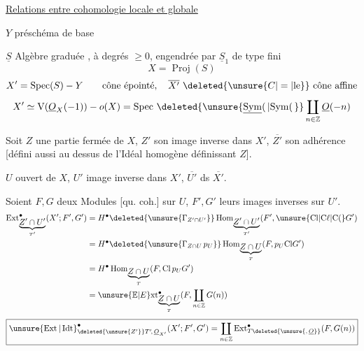 \uline{Relations entre cohomologie locale et globale}

$Y$ préschéma de base

$\underline S$ Algèbre graduée , à degrés $\geq 0$, engendrée par $\underline S_1$ de type fini
\[
 X=\operatorname{Proj}(S)
\]
\[
 X'=\operatorname{Spec}(S)-Y \qquad \text{cône épointé},\quad
 \overline{X'}\ \deleted{\unsure{C|=|\text{le}}}\ \text{cône affine}
\]
\[
 X'\simeq\mathrm V(\underline O_X(-1))-o(X)
 =\operatorname{Spec}\,\deleted{\unsure{\underline{\operatorname{Sym}}(\,|{\operatorname{Sym}}(\,}}%
 \coprod_{n\in\mathbb Z}\underline O(-n)
\]

Soit $Z$ une partie fermée de $X$, $Z'$ son image inverse dans $X'$, $\overline{Z'}$ son adhérence [défini aussi au dessus de l'Idéal homogène définissant $Z$].

$U$ ouvert de $X$, $U'$ image inverse dans $X'$, $\overline{U'}$ ds $\overline{X'}$.

Soient $F,G$ deux Modules [qu. coh.] sur $U$, $F',G'$ leurs images inverses sur $U'$. 
\[
\begin{aligned}
 \operatorname{Ext}^{\bullet}_{\underbrace{Z'\cap U'}_{T'}}(X';F',G')
 &=H^{\bullet}\deleted{\unsure{\Gamma_{Z'\cap U'}}}
 \operatorname{Hom}_{\underbrace{Z'\cap U'}_{T'}}(F',\unsure{\mathrm{Cl}|\mathrm C\ell|\mathrm C(}G')\\
 &=H^{\bullet}\deleted{\unsure{\Gamma_{Z\cap U}\,p_U}}
 \operatorname{Hom}_{\underbrace{Z\cap U}_{T}}(F,p_U\mathrm{Cl}G')\\
 &=H^{\bullet}\operatorname{Hom}_{\underbrace{Z\cap U}_{T}}(F,\mathrm{Cl}\,p_U G')\\
 &=\unsure{\mathbb E|E}\mathrm{xt}^{\bullet}_{\underbrace{Z\cap U}_{T}}
 (F,\coprod_{n\in\mathbb Z}G(n))
\end{aligned}
\]
\[
 \boxed{{\unsure{\operatorname{Ext}|\operatorname{Idt}}}^{\bullet}_{\deleted{\unsure{Z'}}T'\!,\,\underline O_{X'}}(X';F',G')
 =\coprod_{n\in\mathbb Z}\operatorname{Ext}^{\bullet}_{T\deleted{\unsure{,\,\underline O}}}(F,G(n))}
\]

